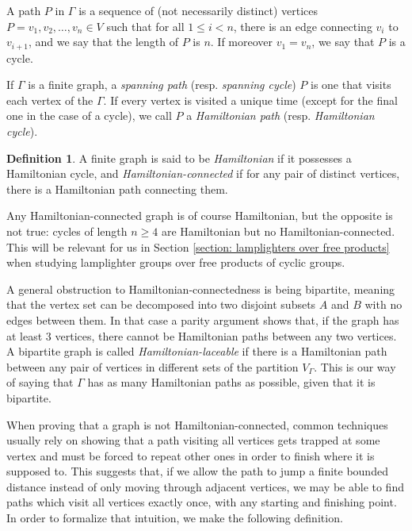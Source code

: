 \documentclass[reqno,oneside]{amsart}
\theoremstyle{plain}
\theoremstyle{definition}
\newtheorem{defn}[thm]{Definition} %
\begin{document}
A path $P$ in $\Gamma$ is a sequence of (not necessarily distinct) vertices $P=v_1,v_2,\ldots, v_n\in V$ such that for all $1\le i <n$, there is an edge connecting $v_{i}$ to $v_{i+1}$, and we say that the length of $P$ is $n$. If moreover $v_1=v_{n}$, we say that $P$ is a cycle.

If $\Gamma$ is a finite graph, a \textit{spanning path} (resp. \textit{spanning cycle}) $P$ is one that visits each vertex of the $\Gamma$. If every vertex is visited a unique time (except for the final one in the case of a cycle), we call $P$ a \textit{Hamiltonian path} (resp.  \textit{Hamiltonian cycle}).

\begin{defn}\label{defn: Hamiltonian connected}
	A finite graph is said to be \textit{Hamiltonian} if it possesses a Hamiltonian cycle, and \textit{Hamiltonian-connected} if for any pair of distinct vertices, there is a Hamiltonian path connecting them.
\end{defn}

Any Hamiltonian-connected graph is of course Hamiltonian, but the opposite is not true: cycles of length $n\ge 4$ are Hamiltonian but no Hamiltonian-connected. This will be relevant for us in Section \ref{section: lamplighters over free products} when studying lamplighter groups over free products of cyclic groups.  

A general obstruction to Hamiltonian-connectedness is being bipartite, meaning that the vertex set can be decomposed into two disjoint subsets $A$ and $B$ with no edges between them. In that case a parity argument shows that, if the graph has at least $3$ vertices, there cannot be Hamiltonian paths between any two vertices. A bipartite graph is called \textit{Hamiltonian-laceable} if there is a Hamiltonian path between any pair of vertices in different sets of the partition $V_{\Gamma}$. This is our way of saying that $\Gamma$ has as many Hamiltonian paths as possible, given that it is bipartite.



When proving that a graph is not Hamiltonian-connected, common techniques usually rely on showing that a path visiting all vertices gets trapped at some vertex and must be forced to repeat other ones in order to finish where it is supposed to. This suggests that, if we allow the path to jump a finite bounded distance instead of only moving through adjacent vertices, we may be able to find paths which visit all vertices exactly once, with any starting and finishing point. In order to formalize that intuition, we make the following definition.
\end{document}

